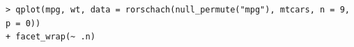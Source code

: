 %

\begin{verbatim}
> qplot(mpg, wt, data = rorschach(null_permute("mpg"), mtcars, n = 9, p = 0)) 
+ facet_wrap(~ .n)
\end{verbatim}


